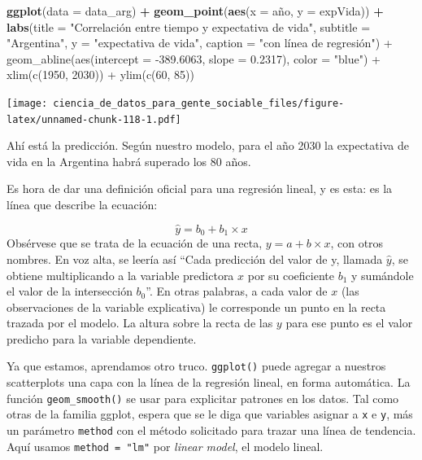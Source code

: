 \documentclass[]{book}
\newenvironment{Shaded}{\begin{snugshade}}{\end{snugshade}}
\newcommand{\KeywordTok}[1]{\textcolor[rgb]{0.13,0.29,0.53}{\textbf{#1}}}
\newcommand{\DataTypeTok}[1]{\textcolor[rgb]{0.13,0.29,0.53}{#1}}
\newcommand{\StringTok}[1]{\textcolor[rgb]{0.31,0.60,0.02}{#1}}
\newcommand{\OperatorTok}[1]{\textcolor[rgb]{0.81,0.36,0.00}{\textbf{#1}}}
\newcommand{\NormalTok}[1]{#1}
\begin{document}
\begin{Shaded}
\begin{Highlighting}[]
\KeywordTok{ggplot}\NormalTok{(}\DataTypeTok{data =}\NormalTok{ data_arg) }\OperatorTok{+}\StringTok{ }
\StringTok{    }\KeywordTok{geom_point}\NormalTok{(}\KeywordTok{aes}\NormalTok{(}\DataTypeTok{x =}\NormalTok{ año, }\DataTypeTok{y =}\NormalTok{ expVida)) }\OperatorTok{+}
\StringTok{    }\KeywordTok{labs}\NormalTok{(}\DataTypeTok{title =} \StringTok{"Correlación entre tiempo y expectativa de vida"}\NormalTok{,}
         \DataTypeTok{subtitle =} \StringTok{"Argentina"}\NormalTok{,}
         \DataTypeTok{y =} \StringTok{"expectativa de vida"}\NormalTok{,}
         \DataTypeTok{caption =} \StringTok{"con línea de regresión") +}
\StringTok{    geom_abline(aes(intercept = -389.6063, slope = 0.2317), color = "}\NormalTok{blue}\StringTok{") +}
\StringTok{    xlim(c(1950, 2030)) +}
\StringTok{    ylim(c(60, 85))}
\end{Highlighting}
\end{Shaded}

\texttt{[image: ciencia\_de\_datos\_para\_gente\_sociable\_files/figure-latex/unnamed-chunk-118-1.pdf]}

Ahí está la predicción. Según nuestro modelo, para el año 2030 la
expectativa de vida en la Argentina habrá superado los 80 años.

Es hora de dar una definición oficial para una regresión lineal, y es
esta: es la línea que describe la ecuación:

\[ \hat{y} = b_0 + b_1 \times x \] Obsérvese que se trata de la ecuación
de una recta, \(y = a + b \times x\), con otros nombres. En voz alta, se
leería así ``Cada predicción del valor de y, llamada \(\hat{y}\), se
obtiene multiplicando a la variable predictora \(x\) por su coeficiente
\(b_1\) y sumándole el valor de la intersección \(b_0\)''. En otras
palabras, a cada valor de \(x\) (las observaciones de la variable
explicativa) le corresponde un punto en la recta trazada por el modelo.
La altura sobre la recta de las \(y\) para ese punto es el valor
predicho para la variable dependiente.

Ya que estamos, aprendamos otro truco. \texttt{ggplot()} puede agregar a
nuestros scatterplots una capa con la línea de la regresión lineal, en
forma automática. La función \texttt{geom\_smooth()} se usar para
explicitar patrones en los datos. Tal como otras de la familia ggplot,
espera que se le diga que variables asignar a \texttt{x} e \texttt{y},
más un parámetro \texttt{method} con el método solicitado para trazar
una línea de tendencia. Aquí usamos \texttt{method\ =\ "lm"} por
\emph{linear model}, el modelo lineal.
\end{document}
